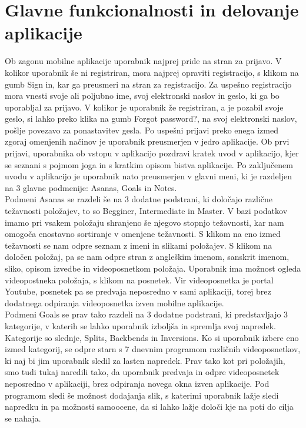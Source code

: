 \documentclass[a4paper, 12pt]{book}
\begin{document}
\section{Glavne funkcionalnosti in delovanje aplikacije}
Ob zagonu mobilne aplikacije uporabnik najprej pride na stran za prijavo. V kolikor uporabnik še ni registriran, mora najprej opraviti registracijo, s klikom na gumb Sign in, kar ga preusmeri na stran za registracijo. Za uspešno registracijo mora vnesti svoje ali poljubno ime, svoj elektronski naslov in geslo, ki ga bo uporabljal za prijavo. V kolikor je uporabnik že registriran, a je pozabil svoje geslo, si lahko preko klika na gumb Forgot password?, na svoj elektronski naslov, pošlje povezavo za ponastavitev gesla. Po uspešni prijavi preko enega izmed zgoraj omenjenih načinov je uporabnik preusmerjen v jedro aplikacije. Ob prvi prijavi, uporabnika ob vstopu v aplikacijo pozdravi kratek uvod v aplikacijo, kjer se seznani s pojmom joga in s kratkim opisom bistva aplikacije. Po zaključenem uvodu v aplikacijo je uporabnik nato preusmerjen v glavni meni, ki je razdeljen na 3 glavne podmenije: Asanas, Goals in Notes.\\

Podmeni Asanas se razdeli še na 3 dodatne podstrani, ki določajo različne težavnosti položajev, to so Begginer, Intermediate in Master. V bazi podatkov imamo pri vsakem položaju shranjeno še njegovo stopnjo težavnosti, kar nam omogoča enostavno sortiranje v omenjene težavnosti. S klikom na eno izmed težavnosti se nam odpre seznam z imeni in slikami položajev. S klikom na določen položaj, pa se nam odpre stran z angleškim imenom, sanskrit imenom, sliko, opisom izvedbe in videoposnetkom položaja. Uporabnik ima možnost ogleda videopostneka položaja, s klikom na posnetek. Vir videoposnetka je portal Youtube, posnetek pa se predvaja neposredno v sami aplikaciji, torej brez dodatnega odpiranja videoposnetka izven mobilne aplikacije. \\

Podmeni Goals se prav tako razdeli na 3 dodatne podstrani, ki predstavljajo 3 kategorije, v katerih se lahko uporabnik izboljša in spremlja svoj napredek. Kategorije so slednje, Splits, Backbends in Inversions. Ko si uporabnik izbere eno izmed kategorij, se odpre starn s 7 dnevnim programom različnih videoposnetkov, ki naj bi jim uporabnik sledil za lasten napredek. Prav tako kot pri položajih, smo tudi tukaj naredili tako, da uporabnik predvaja in odpre videoposnetek neposredno v aplikaciji, brez odpiranja novega okna izven aplikacije. 
Pod programom sledi še možnost dodajanja slik, s katerimi uporabnik lažje sledi napredku in pa možnosti samoocene, da si lahko lažje določi kje na poti do cilja se nahaja.\\
\end{document}

